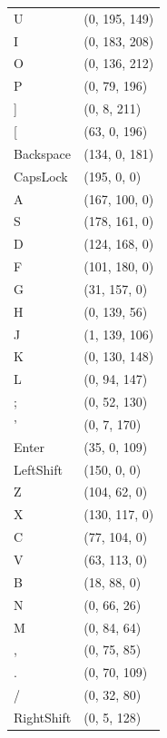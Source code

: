 \documentclass{report}
\begin{document}
\begin{supertabular}{ll}
	U & (0, 195, 149)\\
	I & (0, 183, 208)\\
	O & (0, 136, 212)\\
	P & (0, 79, 196)\\
	] & (0, 8, 211)\\
	{[} & (63, 0, 196)\\
	Backspace & (134, 0, 181)\\
	CapsLock & (195, 0, 0)\\
	A & (167, 100, 0)\\
	S & (178, 161, 0)\\
	D & (124, 168, 0)\\
	F & (101, 180, 0)\\
	G & (31, 157, 0)\\
	H & (0, 139, 56)\\
	J & (1, 139, 106)\\
	K & (0, 130, 148)\\
	L & (0, 94, 147)\\
	; & (0, 52, 130)\\
	' & (0, 7, 170)\\
	Enter & (35, 0, 109)\\
	LeftShift & (150, 0, 0)\\
	Z & (104, 62, 0)\\
	X & (130, 117, 0)\\
	C & (77, 104, 0)\\
	V & (63, 113, 0)\\
	B & (18, 88, 0)\\
	N & (0, 66, 26)\\
	M & (0, 84, 64)\\
	, & (0, 75, 85)\\
	. & (0, 70, 109)\\
	/ & (0, 32, 80)\\
	RightShift & (0, 5, 128)\\

\end{supertabular}

\onecolumn
\end{document}
